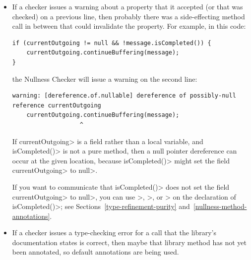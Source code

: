 \begin{itemize}
If the annotations do not appear in the  file, here are two
ways to solve the problem:
\begin{itemize}
\item
  Re-compile the method's class with the Checker Framework compiler.  This will
  ensure that the type annotations are written to the class file, even if
  no type-checking happens during that execution.
\item
  Pass the method's file explicitly on the command line when type-checking,
  so that the compiler reads its source code instead of its 
  file.
\end{itemize}

\item
If a checker issues a warning about a property that it accepted (or that
was checked) on a previous line, then probably there was a side-effecting
method call in between that could invalidate the property.  For example, in
this code:

\begin{Verbatim}
if (currentOutgoing != null && !message.isCompleted()) {
    currentOutgoing.continueBuffering(message);
}
\end{Verbatim}

\noindent
the Nullness Checker will issue a warning on the second line:
\begin{Verbatim}
warning: [dereference.of.nullable] dereference of possibly-null reference currentOutgoing
    currentOutgoing.continueBuffering(message);
                   ^
\end{Verbatim}

If \<currentOutgoing> is a field rather than a local variable, and
\<isCompleted()> is not a pure method, then a null pointer
dereference can occur at the given location, because \<isCompleted()> might set
the field \<currentOutgoing> to \<null>.

If you want to communicate that
\<isCompleted()> does not set the field \<currentOutgoing> to \<null>, you can use
\<>,
\<>,
or \<> on the
declaration of \<isCompleted()>; see Sections~\ref{type-refinement-purity}
and~\ref{nullness-method-annotations}.


\item
If a checker issues a type-checking error for a call that the library's
documentation states is correct, then maybe that library method has not yet
been annotated, so default annotations are being used.


\end{itemize}
